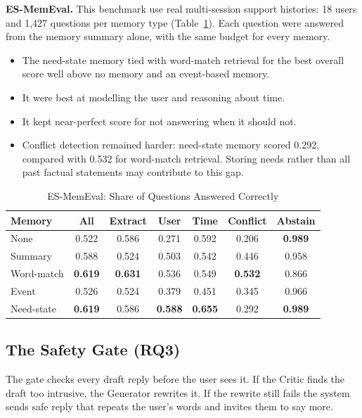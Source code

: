 \documentclass[journal]{IEEEtran}
\newcommand{\tsize}{\footnotesize}
\begin{document}
\textbf{ES-MemEval.} This benchmark use real multi-session support histories: 18 users and 1,427 questions per memory type (Table~\ref{tab:memeval}). Each question were answered from the memory summary alone, with the same budget for every memory.
\begin{itemize}
\item The need-state memory tied with word-match retrieval for the best overall score well above no memory and an event-based memory.
\item It were best at modelling the user and reasoning about time.
\item It kept near-perfect score for not answering when it should not.
\item Conflict detection remained harder: need-state memory scored 0.292, compared with 0.532 for word-match retrieval. Storing needs rather than all past factual statements may contribute to this gap.
\end{itemize}

\begin{table}[!htb]
\caption{ES-MemEval: Share of Questions Answered Correctly}
\label{tab:memeval}
\centering\tsize
\setlength{\tabcolsep}{3pt}
\begin{tabular}{@{}lcccccc@{}}
\toprule
Memory & All & Extract & User & Time & Conflict & Abstain\\
\midrule
None & 0.522 & 0.586 & 0.271 & 0.592 & 0.206 & \textbf{0.989}\\
Summary & 0.588 & 0.524 & 0.503 & 0.542 & 0.446 & 0.958\\
Word-match & \textbf{0.619} & \textbf{0.631} & 0.536 & 0.549 & \textbf{0.532} & 0.866\\
Event & 0.526 & 0.524 & 0.379 & 0.451 & 0.345 & 0.966\\
Need-state & \textbf{0.619} & 0.586 & \textbf{0.588} & \textbf{0.655} & 0.292 & \textbf{0.989}\\
\bottomrule
\end{tabular}
\end{table}

\subsection{The Safety Gate (RQ3)}\label{sec:r-gate}
The gate checks every draft reply before the user sees it. If the Critic finds the draft too intrusive, the Generator rewrites it. If the rewrite still fails the system sends safe reply that repeats the user's words and invites them to say more.
\end{document}
